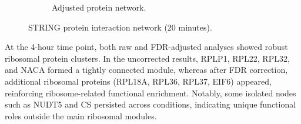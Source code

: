 \documentclass{article}
\begin{document}
\begin{figure}[H]
\begin{subfigure}{0.45\textwidth}
            \caption{Adjusted protein network.}
            \label{fig:protein_network_fdr_20min}
        \end{subfigure}
        \caption{STRING protein interaction network (20 minutes).}
        \label{fig:protein_network_all_20min}
      \end{figure}

      At the 4-hour time point, both raw and FDR-adjusted analyses showed robust ribosomal protein clusters. In the uncorrected results, RPLP1, RPL22, RPL32, and NACA formed a tightly connected module, whereas after FDR correction, additional ribosomal proteins (RPL18A, RPL36, RPL37, EIF6) appeared, reinforcing ribosome-related functional enrichment. Notably, some isolated nodes such as NUDT5 and CS persisted across conditions, indicating unique functional roles outside the main ribosomal modules.
\end{document}

